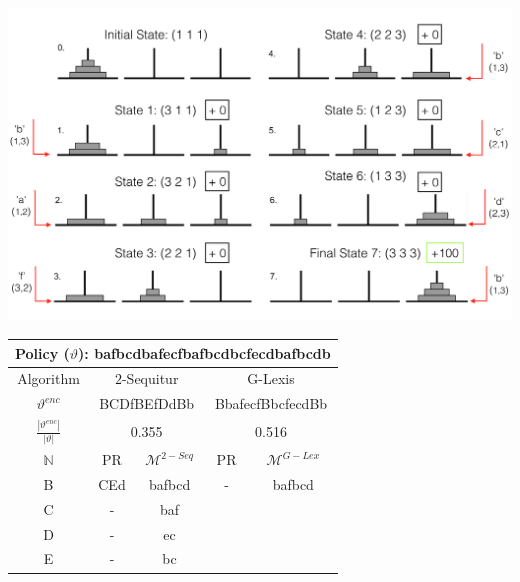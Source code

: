 \documentclass[colorinlistoftodos]{article}
\theoremstyle{definition}
\begin{document}
 \begin{minipage}{\textwidth}
  \begin{minipage}[b]{0.49\textwidth}
    \centering
    \includegraphics[width=\textwidth]{figures/hanoi_problem.png}
  \end{minipage}
  \hfill
  \begin{minipage}[b]{0.49\textwidth}
    \centering
    \begin{tabular}{c | c c | c c } %
\hline\hline %
 \multicolumn{5}{c}{Policy ($\vartheta$): bafbcdbafecfbafbcdbcfecdbafbcdb
} \\
\hline\hline
 Algorithm & \multicolumn{2}{c}{$2$-Sequitur} & \multicolumn{2}{c}{G-Lexis}\\
\hline
 $\vartheta^{enc}$ & \multicolumn{2}{c}{BCDfBEfDdBb} & \multicolumn{2}{c}{BbafecfBbcfecdBb}\\
 $\frac{|\vartheta^{enc}|}{|\vartheta|}$ & \multicolumn{2}{c}{0.355} & \multicolumn{2}{c}{0.516}\\
\hline \hline
$\mathbb{N}$ & PR & $\mathcal{M}^{2-Seq}$ & PR & $\mathcal{M}^{G-Lex}$\\ %
\hline %
B & CEd & bafbcd & - & bafbcd\\
C & - & baf &&  \\
D & - & ec &&  \\
E & - & bc &&  \\ 
\hline %
\end{tabular}
    \end{minipage}
  \end{minipage}
\end{document}
